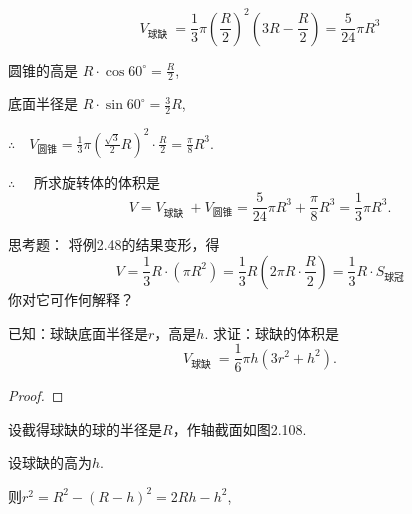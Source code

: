 \begin{solution}
\[V_{\text{球缺 }}=\frac{1}{3}\pi \left(\frac{R}{2}\right)^{2}\left(3R-\frac{R}{2}\right)=\frac{5}{24}\pi  R^{3}\]

圆锥的高是 $R\cdot \cos 60^{\circ}=\frac{R}{2}$,

底面半径是 $R\cdot \sin60^{\circ}=\frac{3}{2}R$,

$\therefore\quad V_{\text{圆锥}}=\frac{1}{3}\pi \left(\frac{\sqrt{3}}{2}R\right)^{2}\cdot \frac{R}{2}=\frac{\pi }{8}R^{3}$.

$\therefore\quad$ 所求旋转体的体积是
\[V=V_{\text{球缺 }}+V_{\text{圆锥}}=\frac{5}{24}\pi  R^{3}+\frac{\pi }{8}R^{3}=\frac{1}{3}\pi  R^{3}.\]
\end{solution}


\begin{thm}
    {思考题：}
将例2.48的结果变形，得
\[V=\frac{1}{3}R\cdot (\pi R^2)=\frac{1}{3}R\left(2\pi R\cdot \frac{R}{2}\right)=\frac{1}{3}R\cdot S_{\text{球冠}}\]
你对它可作何解释？
\end{thm}

\begin{example}
    已知：球缺底面半径是$r$，高是$h$. 求证：球缺的体积是
\[V_{\text{球缺 }}=\frac{1}{6}\pi  h\left(3r^{2}+h^{2}\right).\]
\end{example}

\begin{proof}
    
\end{proof}


设截得球缺的球的半径是$R$，作轴截面如图2.108.

\begin{figure}[htp]
    \centering
{}
    \caption{}
\end{figure}

设球缺的高为$h$.

则$r^{2}=R^{2}-(R-h)^{2}
=2Rh-h^{2}$,

